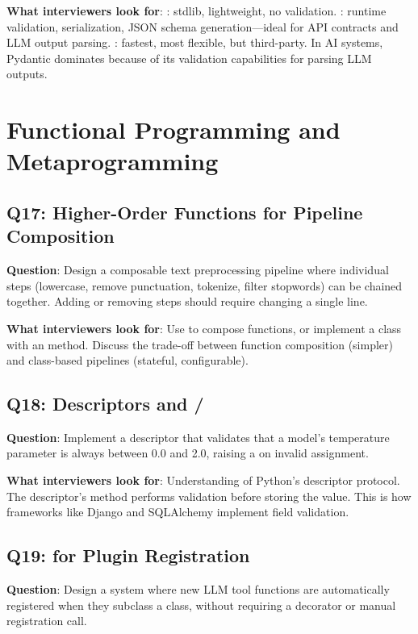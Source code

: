 \textbf{What interviewers look for}: : stdlib, lightweight, no validation. : runtime validation, serialization, JSON schema generation---ideal for API contracts and LLM output parsing. : fastest, most flexible, but third-party. In AI systems, Pydantic dominates because of its validation capabilities for parsing LLM outputs.


\section{Functional Programming and Metaprogramming}

\subsection{Q17: Higher-Order Functions for Pipeline Composition}

\textbf{Question}: Design a composable text preprocessing pipeline where individual steps (lowercase, remove punctuation, tokenize, filter stopwords) can be chained together. Adding or removing steps should require changing a single line.

\textbf{What interviewers look for}: Use  to compose functions, or implement a  class with an  method. Discuss the trade-off between function composition (simpler) and class-based pipelines (stateful, configurable).

\subsection{Q18: Descriptors and /}

\textbf{Question}: Implement a descriptor that validates that a model's temperature parameter is always between 0.0 and 2.0, raising a  on invalid assignment.

\textbf{What interviewers look for}: Understanding of Python's descriptor protocol. The descriptor's  method performs validation before storing the value. This is how frameworks like Django and SQLAlchemy implement field validation.

\subsection{Q19:  for Plugin Registration}

\textbf{Question}: Design a system where new LLM tool functions are automatically registered when they subclass a  class, without requiring a decorator or manual registration call.

